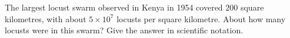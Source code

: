 The largest locust swarm observed in Kenya in 1954 covered $200$ square kilometres, with about $5\times10^7$ locusts per square kilometre. About how many locusts were in this swarm? Give the answer in scientific notation.
